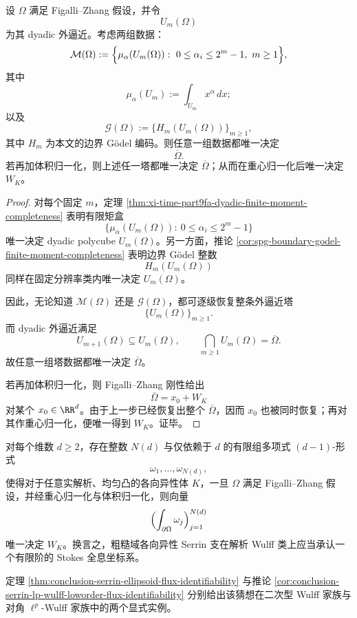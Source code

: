 \begin{theorem}\label{thm:conclusion-serrin-finite-moment-godel-tower-recovery}
设 \(\Omega\) 满足 Figalli--Zhang 假设，并令
\[
U_m(\Omega)
\]
为其 dyadic 外逼近。考虑两组数据：
\[
\mathcal M(\Omega)
:=
\Bigl\{
\mu_\alpha(U_m(\Omega)):\ 0\le \alpha_i\le 2^m-1,\ m\ge 1
\Bigr\},
\]
其中
\[
\mu_\alpha(U_m):=\int_{U_m}x^\alpha\,dx;
\]
以及
\[
\mathcal G(\Omega)
:=
\{H_m(U_m(\Omega))\}_{m\ge 1},
\]
其中 \(H_m\) 为本文的边界 Gödel 编码。则任意一组数据都唯一决定
\[
\overline\Omega.
\]
若再加体积归一化，则上述任一塔都唯一决定 \(\overline\Omega\)；从而在重心归一化后唯一决定 \(W_K\)。
\end{theorem}
\begin{proof}
对每个固定 \(m\)，定理 \ref{thm:xi-time-part9fa-dyadic-finite-moment-completeness} 表明有限矩盒
\[
\{\mu_\alpha(U_m(\Omega)):\ 0\le \alpha_i\le 2^m-1\}
\]
唯一决定 dyadic polycube \(U_m(\Omega)\)。另一方面，推论 \ref{cor:spg-boundary-godel-finite-moment-completeness} 表明边界 Gödel 整数
\[
H_m(U_m(\Omega))
\]
同样在固定分辨率类内唯一决定 \(U_m(\Omega)\)。

因此，无论知道 \(\mathcal M(\Omega)\) 还是 \(\mathcal G(\Omega)\)，都可逐级恢复整条外逼近塔
\[
\{U_m(\Omega)\}_{m\ge 1}.
\]
而 dyadic 外逼近满足
\[
U_{m+1}(\Omega)\subseteq U_m(\Omega),
\qquad
\bigcap_{m\ge 1}U_m(\Omega)=\overline\Omega.
\]
故任意一组塔数据都唯一决定 \(\overline\Omega\)。

若再加体积归一化，则 Figalli--Zhang 刚性给出
\[
\overline\Omega=x_0+W_K
\]
对某个 \(x_0\in\RR^d\)。由于上一步已经恢复出整个 \(\overline\Omega\)，因而 \(x_0\) 也被同时恢复；再对其作重心归一化，便唯一得到 \(W_K\)。证毕。
\end{proof}

\begin{conjecture}\label{conj:conclusion-analytic-wulff-finite-stokes-holography}
对每个维数 \(d\ge 2\)，存在整数 \(N(d)\) 与仅依赖于 \(d\) 的有限组多项式 \((d-1)\)-形式
\[
\omega_1,\dots,\omega_{N(d)},
\]
使得对于任意实解析、均匀凸的各向异性体 \(K\)，一旦 \(\Omega\) 满足 Figalli--Zhang 假设，并经重心归一化与体积归一化，则向量
\[
\Bigl(
\int_{\partial\Omega}\omega_j
\Bigr)_{j=1}^{N(d)}
\]
唯一决定 \(W_K\)。换言之，粗糙域各向异性 Serrin 支在解析 Wulff 类上应当承认一个有限阶的 Stokes 全息坐标系。

定理 \ref{thm:conclusion-serrin-ellipsoid-flux-identifiability} 与推论 \ref{cor:conclusion-serrin-lp-wulff-loworder-flux-identifiability} 分别给出该猜想在二次型 Wulff 家族与对角 \(\ell^p\)-Wulff 家族中的两个显式实例。
\end{conjecture}

